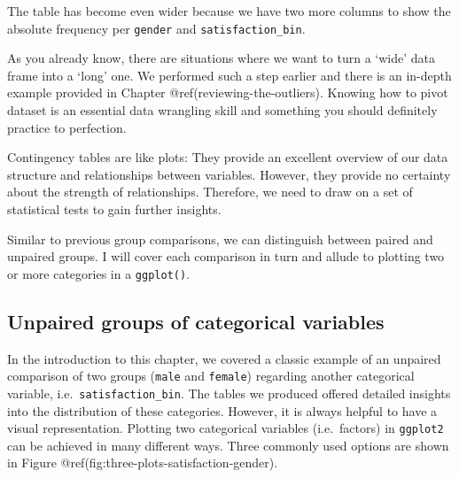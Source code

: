 \documentclass[
  letterpaper,
]{krantz}
\begin{document}
The table has become even wider because we have two more columns to show
the absolute frequency per \texttt{gender} and
\texttt{satisfaction\_bin}.

As you already know, there are situations where we want to turn a `wide'
data frame into a `long' one. We performed such a step earlier and there
is an in-depth example provided in Chapter @ref(reviewing-the-outliers).
Knowing how to pivot dataset is an essential data wrangling skill and
something you should definitely practice to perfection.

Contingency tables are like plots: They provide an excellent overview of
our data structure and relationships between variables. However, they
provide no certainty about the strength of relationships. Therefore, we
need to draw on a set of statistical tests to gain further insights.

Similar to previous group comparisons, we can distinguish between paired
and unpaired groups. I will cover each comparison in turn and allude to
plotting two or more categories in a \texttt{ggplot()}.

\subsection{Unpaired groups of categorical
variables}\label{sec-unpaired-groups-categorical-variables}

In the introduction to this chapter, we covered a classic example of an
unpaired comparison of two groups (\texttt{male} and \texttt{female})
regarding another categorical variable, i.e.~\texttt{satisfaction\_bin}.
The tables we produced offered detailed insights into the distribution
of these categories. However, it is always helpful to have a visual
representation. Plotting two categorical variables (i.e.~factors) in
\texttt{ggplot2} can be achieved in many different ways. Three commonly
used options are shown in Figure
@ref(fig:three-plots-satisfaction-gender).
\end{document}
